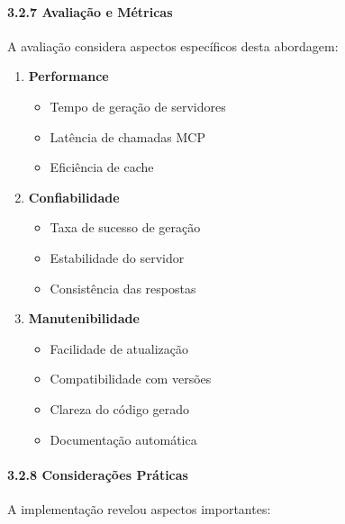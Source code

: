 \documentclass[
]{article}
\providecommand{\tightlist}{%
  \setlength{\itemsep}{0pt}\setlength{\parskip}{0pt}}
\begin{document}
\paragraph{3.2.7 Avaliação e
Métricas}\label{avaliauxe7uxe3o-e-muxe9tricas-1}

A avaliação considera aspectos específicos desta abordagem:

\begin{enumerate}
\def\labelenumi{\arabic{enumi}.}
\item
  \textbf{Performance}

  \begin{itemize}
  \tightlist
  \item
    Tempo de geração de servidores
  \item
    Latência de chamadas MCP
  \item
    Eficiência de cache
  \end{itemize}
\item
  \textbf{Confiabilidade}

  \begin{itemize}
  \tightlist
  \item
    Taxa de sucesso de geração
  \item
    Estabilidade do servidor
  \item
    Consistência das respostas
  \end{itemize}
\item
  \textbf{Manutenibilidade}

  \begin{itemize}
  \tightlist
  \item
    Facilidade de atualização
  \item
    Compatibilidade com versões
  \item
    Clareza do código gerado
  \item
    Documentação automática
  \end{itemize}
\end{enumerate}

\paragraph{3.2.8 Considerações
Práticas}\label{considerauxe7uxf5es-pruxe1ticas-1}

A implementação revelou aspectos importantes:
\end{document}
